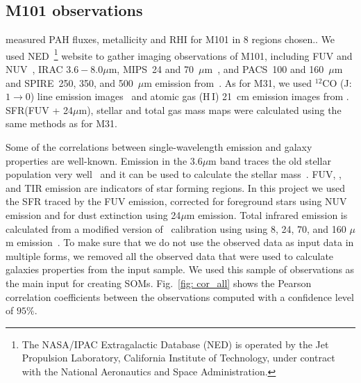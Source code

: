     \subsection{M101 observations}
    \label{Sec: data_M101_SOMN} 
     \cite{Gordon08} measured PAH fluxes, metallicity and RHI for M101 in 8 regions chosen.. %
     We used NED~\footnote{The NASA/IPAC Extragalactic Database (NED) is operated by the Jet Propulsion Laboratory, California Institute of Technology, under contract with the National Aeronautics and Space Administration.} website to gather imaging observations of M101, including 
      \GALEX FUV and NUV~\citep{depaz07}, IRAC $3.6-8.0\mu$m, MIPS~24 and 70~$\mu$m~\citep{Dale09}, and  PACS~100 and 160~$\mu$m and SPIRE~250, 350, and 500~$\mu$m emission from~\cite{Kennicutt11}.
     As for M31, we used $^{12}$CO (J:$1\rightarrow0$) line emission images~\citep{Helfer03} and atomic gas (H\,{\sc I}) 21~cm emission images from \cite{Walter08}.
     SFR(FUV + 24$\mu$m), stellar and total gas mass maps were calculated using the same methods as for M31.
     
     Some of the correlations between single-wavelength emission and galaxy properties are well-known.
     Emission in the 3.6$\mu$m band traces the old stellar population very well~\citep[e.g]{Leitherer99,Smith07a} and it can be used to calculate the stellar mass~\citep{Eskew12}.
     FUV, \halpha, and TIR emission are indicators of star forming regions.
     In this project we used the SFR traced by the FUV emission, corrected for foreground stars using NUV emission and for dust extinction using 24$\mu$m emission.
     Total infrared emission is calculated from a modified version of~\cite{Draine07} calibration using using 8, 24, 70, and 160 $\mu$m emission~\citep{Boquien10}.
     To make sure that we do not use the observed data as input data in multiple forms, we removed all the observed data that were used to calculate galaxies properties from the input sample.
     We used this sample of observations as the main input for creating SOMs.
     Fig.~\ref{fig: cor_all} shows the Pearson correlation coefficients between the observations computed with a confidence level of $95\%$. 
     
